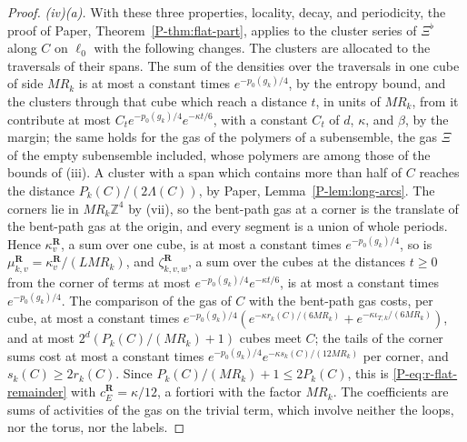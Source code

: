 \documentclass[11pt]{preprint}
\numberwithin{equation}{section}
\theoremstyle{definition}
\theoremstyle{remark}
\theoremstyle{plain}
\begin{document}
\begin{proof}
\emph{(iv)(a).} With these three properties, locality, decay, and periodicity, the proof of Paper, Theorem~\ref{P-thm:flat-part}, applies to the cluster series of $\Xi^\flat$ along $C$ on $\ell_0$ with the following changes. The clusters are allocated to the traversals of their spans. The sum of the densities over the traversals in one cube of side $MR_k$ is at most a constant times $e^{-p_0(g_k)/4}$, by the entropy bound, and the clusters through that cube which reach a distance $t$, in units of $MR_k$, from it contribute at most $C_te^{-p_0(g_k)/4}e^{-\kappa t/6}$, with a constant $C_t$ of $d$, $\kappa$, and $\beta$, by the margin; the same holds for the gas of the polymers of a subensemble, the gas $\Xi$ of the empty subensemble included, whose polymers are among those of the bounds of (iii). A cluster with a span which contains more than half of $C$ reaches the distance $P_k(C)/(2\Lambda(C))$, by Paper, Lemma~\ref{P-lem:long-arcs}. The corners lie in $MR_k\mathbb Z^4$ by (vii), so the bent-path gas at a corner is the translate of the bent-path gas at the origin, and every segment is a union of whole periods. Hence $\kappa^{\mathbf R}_v$, a sum over one cube, is at most a constant times $e^{-p_0(g_k)/4}$, so is $\mu^{\mathbf R}_{k,v} = \kappa^{\mathbf R}_v/(LMR_k)$, and $\zeta^{\mathbf R}_{k,v,w}$, a sum over the cubes at the distances $t \geq 0$ from the corner of terms at most $e^{-p_0(g_k)/4}e^{-\kappa t/6}$, is at most a constant times $e^{-p_0(g_k)/4}$. The comparison of the gas of $C$ with the bent-path gas costs, per cube, at most a constant times $e^{-p_0(g_k)/4}(e^{-\kappa r_k(C)/(6MR_k)} + e^{-\kappa\iota_{T,k}/(6MR_k)})$, and at most $2^d(P_k(C)/(MR_k) + 1)$ cubes meet $C$; the tails of the corner sums cost at most a constant times $e^{-p_0(g_k)/4}e^{-\kappa s_k(C)/(12MR_k)}$ per corner, and $s_k(C) \geq 2r_k(C)$. Since $P_k(C)/(MR_k) + 1 \leq 2P_k(C)$, this is \eqref{P-eq:r-flat-remainder} with $c^{\mathbf R}_E = \kappa/12$, a fortiori with the factor $MR_k$. The coefficients are sums of activities of the gas on the trivial term, which involve neither the loops, nor the torus, nor the labels.


\end{proof}
\end{document}
